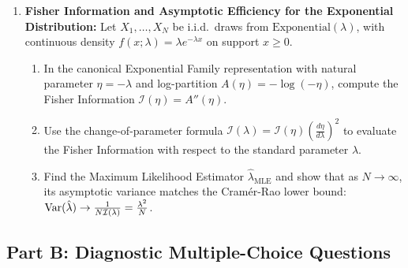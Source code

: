 \begin{enumerate}[label=\textbf{P\arabic*.}]
    \item \textbf{Fisher Information and Asymptotic Efficiency for the Exponential Distribution:}
    Let $X_1, \dots, X_N$ be i.i.d.\ draws from $\text{Exponential}(\lambda)$, with continuous density $f(x; \lambda) = \lambda e^{-\lambda x}$ on support $x \ge 0$.
    \begin{enumerate}[label=(\alph*)]
        \item In the canonical Exponential Family representation with natural parameter $\eta = -\lambda$ and log-partition $A(\eta) = -\log(-\eta)$, compute the Fisher Information $\mathcal{I}(\eta) = A''(\eta)$.
        \item Use the change-of-parameter formula $\mathcal{I}(\lambda) = \mathcal{I}(\eta) \left(\frac{d\eta}{d\lambda}\right)^2$ to evaluate the Fisher Information with respect to the standard parameter $\lambda$.
        \item Find the Maximum Likelihood Estimator $\hat{\lambda}_{\text{MLE}}$ and show that as $N \to \infty$, its asymptotic variance matches the Cramér-Rao lower bound: $\operatorname{Var}(\hat{\lambda}) \to \frac{1}{N \mathcal{I}(\lambda)} = \frac{\lambda^2}{N}$.
    \end{enumerate}
\end{enumerate}

\subsection*{Part B: Diagnostic Multiple-Choice Questions}

